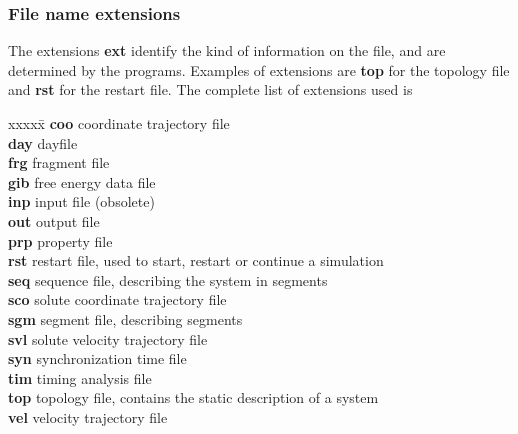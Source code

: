 \subsubsection{File name extensions}
\label{extensions}
\par
The extensions {\bf ext} 
identify the kind of information on the file, and are determined by the 
programs. Examples of extensions are {\bf top} for the topology file and 
{\bf rst} for the restart file.
The complete list of extensions used is
\begin{tabbing}
xxxxx\=\kill
{\bf coo} \> coordinate trajectory file\\
{\bf day} \> dayfile\\
{\bf frg} \> fragment file\\
{\bf gib} \> free energy data file\\
{\bf inp} \> input file (obsolete)\\
{\bf out} \> output file\\
{\bf prp} \> property file\\
{\bf rst} \> restart file, used to start, restart or continue a simulation \\
{\bf seq} \> sequence file, describing the system in segments\\
{\bf sco} \> solute coordinate trajectory file\\
{\bf sgm} \> segment file, describing segments\\
{\bf svl} \> solute velocity trajectory file\\
{\bf syn} \> synchronization time file\\
{\bf tim} \> timing analysis file\\
{\bf top} \> topology file, contains the static description of a system\\
{\bf vel} \> velocity trajectory file\\
\end{tabbing}

